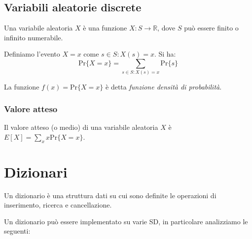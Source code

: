 \documentclass[a4paper,10pt]{article}
\theoremstyle{definition}
\newcommand{\reals}{\mathbb{R}}
\begin{document}
\subsection{Variabili aleatorie discrete}
Una variabile aleatoria $X$ è una funzione $X : S \to \reals$, dove $S$ può essere finito o infinito numerabile.

Definiamo l'evento $X = x$ come $s \in S : X(s) = x$. Si ha:
\[\text{Pr}\{ X = x \} = \sum\limits_{s \in S : X(s) = x} \text{Pr}\{s\}\]

La funzione $f(x) = \text{Pr}\{ X = x \}$ è detta \emph{funzione densità di probabilità}.

\subsubsection{Valore atteso}
Il valore atteso (o medio) di una variabile aleatoria $X$ è $E[X] = \sum\limits_x x\text{Pr}\{X = x\}$.
\newpage
\section{Dizionari}
Un dizionario è una struttura dati su cui sono definite le operazioni di inserimento, ricerca e cancellazione.\smallskip

Un dizionario può essere implementato su varie SD, in particolare analizziamo le seguenti:
\end{document}

